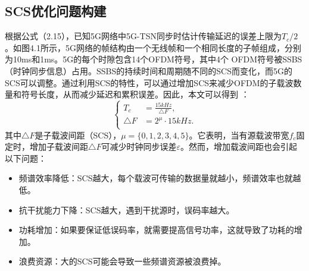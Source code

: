 \documentclass[UTF8,a4paper,12pt]{ctexart}
\numberwithin{equation}{section}
\begin{document}
\subsection{SCS优化问题构建}
根据公式（2.15），已知5G网络中5G-TSN同步时估计传输延迟的误差上限为$T_c/2$。如图4.1所示，5G网络的帧结构由一个无线帧和一个相同长度的子帧组成，分别为10ms和1ms。5G的每个时隙包含14个OFDM符号，其中4个 OFDM符号被SSBS（时钟同步信息）占用。SSBS的持续时间和周期随不同的SCS而变化，而5G的SCS可以调整。通过利用SCS的特性，可以通过增加SCS来减少OFDM的子载波数量和符号长度，从而减少延迟和累积误差。因此，本文可以得到 ：
\begin{equation}
	\left\{
	\begin{aligned}
		T_{c}&=\frac{15kHz}{\triangle F},\\
		\triangle F&=2^\mu\cdot15kHz.\\
	\end{aligned}
	\right.
\end{equation}
其中$\triangle F$是子载波间距（SCS），$\mu=\{0,1,2,3,4,5\}$。它表明，当有源载波带宽$f_c$固定时，增加子载波间距$\triangle F$可减少时钟同步误差$\varepsilon$。然而，增加载波间距也会引起以下问题：
\begin{itemize}
	\item 频谱效率降低：SCS越大，每个载波可传输的数据量就越小，频谱效率也就越低。
	
	\item 抗干扰能力下降：SCS越大，遇到干扰源时，误码率越大。
	
	\item 功耗增加：如果要保证低误码率，就需要提高信号功率，这就导致了功耗的增加。
	
	\item 浪费资源：大的SCS可能会导致一些频谱资源被浪费掉。
\end{itemize}
\end{document}
